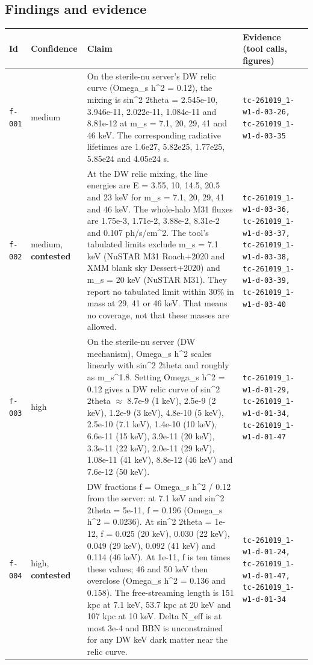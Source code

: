 \documentclass[11pt,a4paper]{article}
\begin{document}
\subsection{Findings and evidence}
\begin{longtable}{@{}p{}p{}p{}p{}@{}}
\toprule Id & Confidence & Claim & Evidence (tool calls, figures) \\ \midrule \endhead
\texttt{f-001} & medium & On the sterile-nu server's DW relic curve (Omega\_s h\textasciicircum{}2 = 0.12), the mixing is sin\textasciicircum{}2 2theta = 2.545e-10, 3.946e-11, 2.022e-11, 1.084e-11 and 8.81e-12 at m\_s = 7.1, 20, 29, 41 and 46 keV. The corresponding radiative lifetimes are 1.6e27, 5.82e25, 1.77e25, 5.85e24 and 4.05e24 s. & \texttt{tc-261019\_\allowbreak{}1-w1-d-03-26,\allowbreak{} tc-261019\_\allowbreak{}1-w1-d-03-35} \\
\texttt{f-002} & medium, \textbf{contested} & At the DW relic mixing, the line energies are E = 3.55, 10, 14.5, 20.5 and 23 keV for m\_s = 7.1, 20, 29, 41 and 46 keV. The whole-halo M31 fluxes are 1.75e-3, 1.71e-2, 3.88e-2, 8.31e-2 and 0.107 ph/s/cm\textasciicircum{}2. The tool's tabulated limits exclude m\_s = 7.1 keV (NuSTAR M31 Roach+2020 and XMM blank sky Dessert+2020) and m\_s = 20 keV (NuSTAR M31). They report no tabulated limit within 30\% in mass at 29, 41 or 46 keV. That means no coverage, not that these masses are allowed. & \texttt{tc-261019\_\allowbreak{}1-w1-d-03-36,\allowbreak{} tc-261019\_\allowbreak{}1-w1-d-03-37,\allowbreak{} tc-261019\_\allowbreak{}1-w1-d-03-38,\allowbreak{} tc-261019\_\allowbreak{}1-w1-d-03-39,\allowbreak{} tc-261019\_\allowbreak{}1-w1-d-03-40} \\
\texttt{f-003} & high & On the sterile-nu server (DW mechanism), Omega\_s h\textasciicircum{}2 scales linearly with sin\textasciicircum{}2 2theta and roughly as m\_s\textasciicircum{}1.8. Setting Omega\_s h\textasciicircum{}2 = 0.12 gives a DW relic curve of sin\textasciicircum{}2 2theta $\approx$ 8.7e-9 (1 keV), 2.5e-9 (2 keV), 1.2e-9 (3 keV), 4.8e-10 (5 keV), 2.5e-10 (7.1 keV), 1.4e-10 (10 keV), 6.6e-11 (15 keV), 3.9e-11 (20 keV), 3.3e-11 (22 keV), 2.0e-11 (29 keV), 1.08e-11 (41 keV), 8.8e-12 (46 keV) and 7.6e-12 (50 keV). & \texttt{tc-261019\_\allowbreak{}1-w1-d-01-29,\allowbreak{} tc-261019\_\allowbreak{}1-w1-d-01-34,\allowbreak{} tc-261019\_\allowbreak{}1-w1-d-01-47} \\
\texttt{f-004} & high, \textbf{contested} & DW fractions f = Omega\_s h\textasciicircum{}2 / 0.12 from the server: at 7.1 keV and sin\textasciicircum{}2 2theta = 5e-11, f = 0.196 (Omega\_s h\textasciicircum{}2 = 0.0236). At sin\textasciicircum{}2 2theta = 1e-12, f = 0.025 (20 keV), 0.030 (22 keV), 0.049 (29 keV), 0.092 (41 keV) and 0.114 (46 keV). At 1e-11, f is ten times these values; 46 and 50 keV then overclose (Omega\_s h\textasciicircum{}2 = 0.136 and 0.158). The free-streaming length is 151 kpc at 7.1 keV, 53.7 kpc at 20 keV and 107 kpc at 10 keV. Delta N\_eff is at most 3e-4 and BBN is unconstrained for any DW keV dark matter near the relic curve. & \texttt{tc-261019\_\allowbreak{}1-w1-d-01-24,\allowbreak{} tc-261019\_\allowbreak{}1-w1-d-01-47,\allowbreak{} tc-261019\_\allowbreak{}1-w1-d-01-34} \\

\end{longtable}
\end{document}
